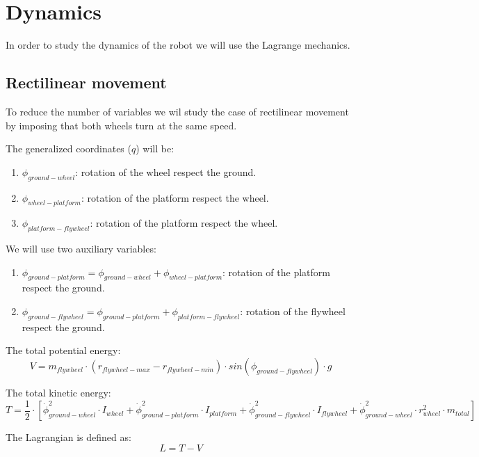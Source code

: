 \section{Dynamics}

In order to study the dynamics of the robot we will use the Lagrange mechanics.

\subsection{Rectilinear movement}
To reduce the number of variables we wil study the case of rectilinear
movement by imposing that both wheels turn at the same speed.

The generalized coordinates ($q$) will be:
\begin{enumerate}
	\item $\phi_{ground-wheel}$: rotation of the wheel respect the ground.
	\item $\phi_{wheel-platform}$: rotation of the platform respect the wheel.
	\item $\phi_{platform-flywheel}$: rotation of the platform respect the wheel.
\end{enumerate}

We will use two auxiliary variables:
\begin{enumerate}
	\item $\phi_{ground-platform}=\phi_{ground-wheel}+\phi_{wheel-platform}$: rotation of the platform respect the ground.
	\item $\phi_{ground-flywheel}=\phi_{ground-platform}+\phi_{platform-flywheel}$: rotation of the flywheel respect the ground.
\end{enumerate}

The total potential energy:
\begin{equation}
	V = m_{flywheel}\cdot (r_{flywheel-max}-r_{flywheel-min}) \cdot sin(\phi_{ground-flywheel}) \cdot g	
\end{equation}


The total kinetic energy:
\begin{equation}
	T = \frac{1}{2}\cdot[\dot{\phi}_{ground-wheel}^2\cdot I_{wheel}
	+ \dot{\phi}_{ground-platform}^2 \cdot I_{platform}
	+ \dot{\phi}_{ground-flywheel}^2\cdot I_{flywheel}
	+ \dot{\phi}_{ground-wheel}^2\cdot r_{wheel}^2\cdot m_{total}]	
\end{equation}

The Lagrangian is defined as:
\begin{equation}
	L=T-V	
\end{equation}

